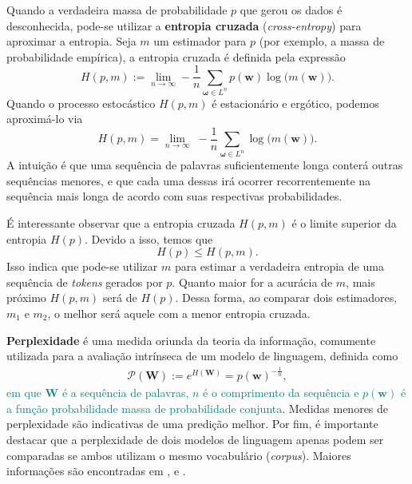 \documentclass[twoside]{automatextcc}
\newcommand{\nico}[1]{\textcolor{teal}{#1}}
\newcommand{\Perp}{\mathcal{P}}
\newcommand{\bs}[1]{\boldsymbol{#1}}
\begin{document}
Quando a verdadeira massa de probabilidade $p$ que gerou os dados é desconhecida, pode-se utilizar a \textbf{entropia cruzada} (\textit{cross-entropy}) para aproximar a entropia. Seja $m$ um estimador para $p$ (por exemplo, a massa de probabilidade empírica), a entropia cruzada é definida pela expressão
\begin{equation*}
    H(p,m) := \lim_{n \rightarrow \infty}  - \frac{1}{n} \sum_{\bs\omega \in L^n}  p(\bs{w}) \log\big(m(\bs{w})\big) .
\end{equation*}
Quando o processo estocástico $H(p,m)$ é estacionário e ergótico, podemos aproximá-lo via
\begin{equation*}
    H(p,m) = \lim_{n \rightarrow \infty} \; - \frac{1}{n} \sum_{\bs\omega \in L^n} \log\big(m(\bs{w})\big).
\end{equation*}
A intuição é que uma sequência de palavras suficientemente longa conterá outras sequências menores, e que cada uma dessas irá ocorrer recorrentemente na sequência mais longa de acordo com suas respectivas probabilidades.

É interessante observar que a entropia cruzada $H(p,m)$ é o limite superior da entropia $H(p)$. Devido a isso, temos que
\begin{equation*}
    H(p) \leq H(p,m).
\end{equation*}
Isso indica que pode-se utilizar $m$ para estimar a verdadeira entropia de uma sequência de \textit{tokens} gerados por $p$. Quanto maior for a acurácia de $m$, mais próximo $H(p,m)$ será de $H(p)$. Dessa forma, ao comparar dois estimadores, $m_1$ e $m_2$, o melhor será aquele com a menor entropia cruzada.

\textbf{Perplexidade} é uma medida oriunda da teoria da informação, comumente utilizada para a avaliação intrínseca de um modelo de linguagem, definida como
\begin{align*}
    \Perp (\bs{W}) := e^{H(\bs{W})} = p(\bs{w})^{-\frac{1}{n}},
\end{align*}
\nico{em que $\bs{W}$ é a sequência de palavras, $n$ é o comprimento da sequência e $p(\bs{w})$ é a função probabilidade massa de probabilidade conjunta}. 
Medidas menores de perplexidade são indicativas de uma predição melhor. Por fim, é importante destacar que a perplexidade de dois modelos de linguagem apenas podem ser comparadas se ambos utilizam o mesmo vocabulário (\textit{corpus}). Maiores informações são encontradas em \citet{manning1999}, \citet{kamath2019} e \citet{jurafsky2021}.
\end{document}
